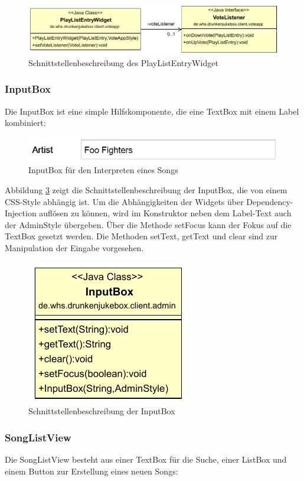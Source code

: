 \begin{figure}[tbh]
	\centering
	\includegraphics[width=1.0\linewidth]{Bilder/PlayListEntry.pdf}
	\caption{Schnittstellenbeschreibung des PlayListEntryWidget}
	\label{fig:PlayListEntryClass}
\end{figure}


\subsubsection{InputBox}
Die InputBox ist eine simple Hilfskomponente, die eine TextBox mit einem Label kombiniert:

\begin{figure}[H]
\centering
\includegraphics[width=0.7\linewidth]{Bilder/InputBox}
\caption{InputBox für den Interpreten eines Songs}
\label{fig:InputBox}
\end{figure}

Abbildung \ref{fig:InputBoxClass} zeigt die Schnittstellenbeschreibung der InputBox, die von einem CSS-Style abhängig ist. Um die Abhängigkeiten der Widgets über Dependency-Injection auflösen zu können, wird im Konstruktor neben dem Label-Text auch der AdminStyle übergeben. Über die Methode setFocus kann der Fokus auf die TextBox gesetzt werden. Die Methoden setText, getText und clear sind zur Manipulation der Eingabe vorgesehen.

\begin{figure}[H]
\centering
\includegraphics[width=0.3\linewidth]{Bilder/InputBoxClass}
\caption{Schnittstellenbeschreibung der InputBox}
\label{fig:InputBoxClass}
\end{figure}


\newpage
\subsubsection{SongListView}
Die SongListView besteht aus einer TextBox für die Suche, einer ListBox und einem Button zur Erstellung eines neuen Songs:

